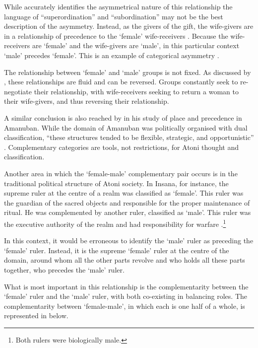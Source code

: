 While \citeauthor{scno71} accurately identifies the asymmetrical
nature of this relationship the language of ``superordination'' and ``subordination''
may not be the best description of the asymmetry.
Instead, as the givers of the gift, the wife-givers
are in a relationship of precedence to the  `female' wife-receivers \citep{fo94,fo99}.
Because the wife-receivers are  `female' and the wife-givers are  `male',
in this particular context  `male' precedes  `female'.
This is an example of categorical asymmetry \cite[47]{fo94}.

The relationship between  `female' and  `male' groups is not fixed.
As discussed by \cite{fo99}, these relationships are fluid and can be reversed.
Groups constantly seek to re-negotiate their relationship,
with wife-receivers seeking to return a woman to their wife-givers,
and thus reversing their relationship.

A similar conclusion is also reached by \cite{mcw02}
in his study of place and precedence in Amanuban.
While the domain of Amanuban was politically organised with
dual classification, ``these structures tended to
be flexible, strategic, and opportunistic'' \cite[287]{mcw02}.
Complementary categories are tools, not restrictions,
for Atoni thought and classification.

Another area in which the  `female-male'
complementary pair occurs is in the traditional political structure of Atoni society.
In Insana, for instance, the supreme ruler at the centre of a realm
was classified as  `female'.
This  ruler was the guardian of the sacred objects
and responsible for the proper maintenance of ritual.
He was complemented by another ruler, classified as  `male'.
This  ruler was the executive authority of the realm
and had responsibility for warfare \cite[371ff]{scno71}.\footnote{
		Both rulers were biologically male.}

In this context, it would be erroneous to identify
the  `male' ruler as preceding the  `female' ruler.
Instead, it is the supreme  `female' ruler at the centre of the domain,
around whom all the other parts revolve and who holds all these parts together,
who precedes the  `male' ruler.

What is most important in this relationship is the complementarity between
the  `female' ruler and the  `male' ruler,
with both co-existing in balancing roles.
The complementarity between  `female-male',
in which each is one half of a whole,
is represented in  below.

